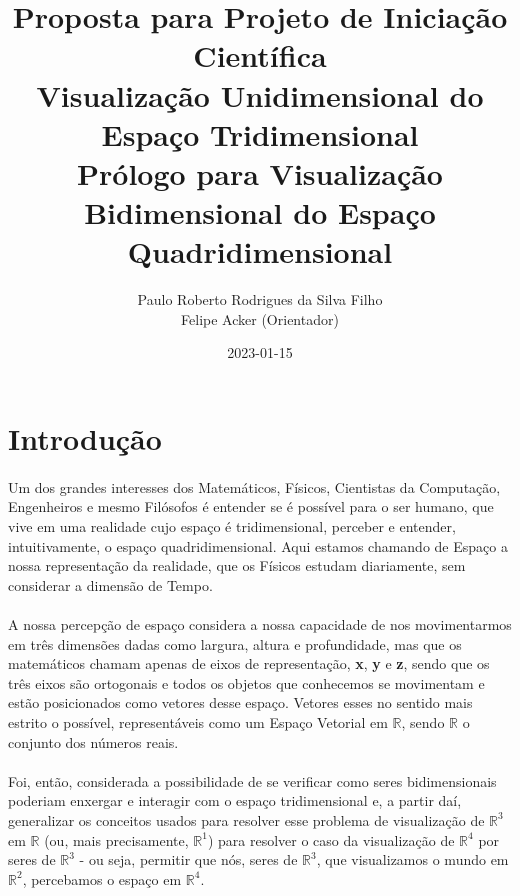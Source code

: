 \documentclass{article}
\title{
	Proposta para Projeto de Iniciação Científica \\
	Visualização Unidimensional do Espaço Tridimensional \\
	\large Prólogo para Visualização Bidimensional do Espaço Quadridimensional
}
\date{2023-01-15}
\author{Paulo Roberto Rodrigues da Silva Filho\\ \small Felipe Acker (Orientador)}
\newcommand\R{\mathbb{R}}
\begin{document}
	\renewcommand{\figurename}{Figura}
	\graphicspath{ {./imagens/} }
	\maketitle
	\tableofcontents
	
	\section{Introdução}
	
	\paragraph{} 
	Um dos grandes interesses dos Matemáticos, Físicos, Cientistas da Computação, Engenheiros e mesmo Filósofos é entender se é possível para o ser humano, que vive em uma realidade cujo espaço é tridimensional, perceber e entender, intuitivamente, o espaço quadridimensional. Aqui estamos chamando de Espaço a nossa representação da realidade, que os Físicos estudam diariamente, sem considerar a dimensão de Tempo. 
	
	\paragraph{}
	A nossa percepção de espaço considera a nossa capacidade de nos movimentarmos em três dimensões dadas como largura, altura e profundidade, mas que os matemáticos chamam apenas de eixos de representação, \textbf{x}, \textbf{y} e \textbf{z}, sendo que os três eixos são ortogonais e todos os objetos que conhecemos se movimentam e estão posicionados como vetores desse espaço. Vetores esses no sentido mais estrito o possível, representáveis como um Espaço Vetorial em $\R$, sendo $\R$ o conjunto dos números reais.
	
	\paragraph{}
	Foi, então, considerada a possibilidade de se verificar como seres bidimensionais poderiam enxergar e interagir com o espaço tridimensional e, a partir daí, generalizar os conceitos usados para resolver esse problema de visualização de $\R^3$ em $\R$ (ou, mais precisamente, $\R^1$) para resolver o caso da visualização de $\R^4$ por seres de $\R^3$ - ou seja, permitir que nós, seres de $\R^3$, que visualizamos o mundo em $\R^2$, percebamos o espaço em $\R^4$.
	
\end{document}

